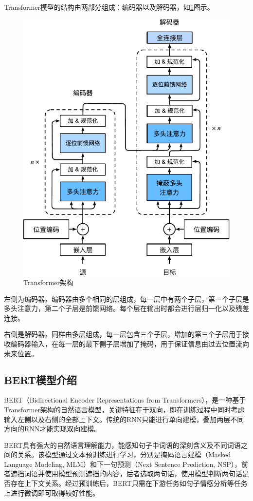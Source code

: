 Transformer模型的结构由两部分组成：编码器以及解码器，如\ref{fig:transformer_struct}图示。

\begin{figure}[htbp]
    \centering
    \includegraphics[width=.67\linewidth]{img/multimodal/transformer.pdf}
    \caption{Transformer架构\cite{zhang2023dive}}
    \label{fig:transformer_struct}
\end{figure}

左侧为编码器，编码器由多个相同的层组成，每一层中有两个子层，第一个子层是多头注意力，第二个子层是前馈网络。每个层在输出时都会进行层归一化以及残差连接。

右侧是解码器，同样由多层组成，每一层包含三个子层，增加的第三个子层用于接收编码器输入，在每一层的最下侧子层增加了掩码，用于保证信息由过去位置流向未来位置。

\subsection{BERT模型介绍}
BERT（Bidirectional Encoder Representations from Transformers），是一种基于Transformer架构的自然语言模型，关键特征在于双向，即在训练过程中同时考虑输入左侧以及右侧的全部上下文。传统的RNN只能进行单向建模，叠加两层不同方向的RNN才能实现双向建模。

BERT具有强大的自然语言理解能力，能感知句子中词语的深刻含义及不同词语之间的关系。该模型通过文本预训练进行学习，分别是掩码语言建模（Masked Language Modeling, MLM）和下一句预测（Next Sentence Prediction, NSP），前者遮挡词语并使用模型预测遮挡的内容，后者选取两句话，使用模型判断两句话是否存在上下文关系。经过预训练后，BERT只需在下游任务如句子情感分析等任务上进行微调即可取得较好性能。

